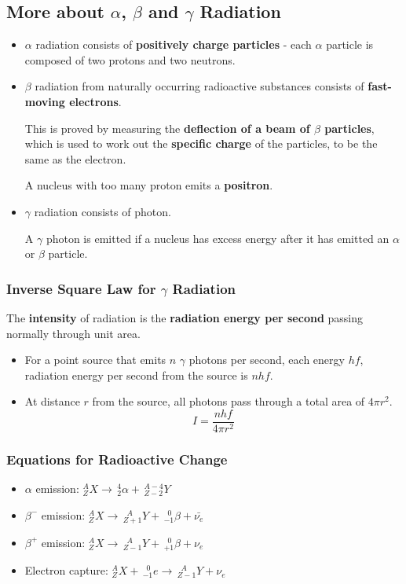 \subsection{More about $\alpha$, $\beta$ and $\gamma$ Radiation}

\begin{itemize}
    \item $\alpha$ radiation consists of \textbf{positively charge particles} - each $\alpha$ particle is composed of two protons and two neutrons.
    \item $\beta$ radiation from naturally occurring radioactive substances consists of \textbf{fast-moving electrons}.

        This is proved by measuring the \textbf{deflection of a beam of $\beta$ particles}, which is used to work out the \textbf{specific charge} of the particles, to be the same as the electron.

        A nucleus with too many proton emits a \textbf{positron}.
    \item $\gamma$ radiation consists of photon.

        A $\gamma$ photon is emitted if a nucleus has excess energy after it has emitted an $\alpha$ or $\beta$ particle.
\end{itemize}

\subsubsection*{Inverse Square Law for $\gamma$ Radiation}

The \textbf{intensity} of radiation is the \textbf{radiation energy per second} passing normally through unit area.
\begin{itemize}
    \item For a point source that emits $n$ $\gamma$ photons per second, each energy $hf$, radiation energy per second from the source is $nhf$.
    \item At distance $r$ from the source, all photons pass through a total area of $4\pi r^2$.
        $$I=\frac{nhf}{4\pi r^2}$$
\end{itemize}

\subsubsection*{Equations for Radioactive Change}
\begin{itemize}
    \item $\alpha$ emission: $^A_ZX\to\,^4_2\alpha+\,^{A-4}_{Z-2}Y$
    \item $\beta^-$ emission: $^A_ZX\to\,^{\hspace{6pt}A}_{Z+1}Y+\,^{\hspace{6pt}0}_{-1}\beta+\bar{\nu_e}$
    \item $\beta^+$ emission: $^A_ZX\to\,^{\hspace{6pt}A}_{Z-1}Y+\,^{\hspace{6pt}0}_{+1}\beta+\nu_e$
    \item Electron capture: $^A_ZX+\,^{\hspace{6pt}0}_{-1}e\to\,^{\hspace{6pt}A}_{Z-1}Y+\nu_e$
\end{itemize}
